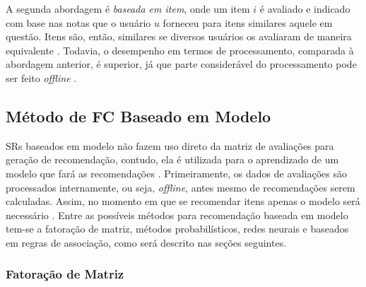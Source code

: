             A segunda abordagem é \textit{baseada em item}, onde um item $i$ é avaliado e indicado com base nas notas que o usuário $u$ forneceu para itens similares aquele em questão. Itens são, então, similares se diversos usuários os avaliaram de maneira equivalente \cite{Ricci2010}. Todavia, o desempenho em termos de processamento, comparada à abordagem anterior, é superior, já que parte considerável do processamento pode ser feito \textit{offline} \cite{Jannach2010, Miranda2010}.
            
                        
    
    
    \subsection{Método de FC Baseado em Modelo}

        SRs baseados em modelo  não fazem uso direto da matriz de avaliações para geração de recomendação, contudo, ela é utilizada para o aprendizado de um modelo que fará as recomendações \cite{Adomavicius2005}. Primeiramente, os dados de avaliações são processados internamente, ou seja, \textit{offline}, antes mesmo de  recomendações serem calculadas. Assim, no momento em que se recomendar itens apenas o modelo será necessário \cite{Jannach2010}. Entre as possíveis métodos para recomendação baseada em modelo tem-se a fatoração de matriz, métodos probabilísticos, redes neurais e baseados em regras de associação, como será descrito nas seções seguintes. 
        
        \ProximoForaDoSumario
        \subsubsection{Fatoração de Matriz}
        
